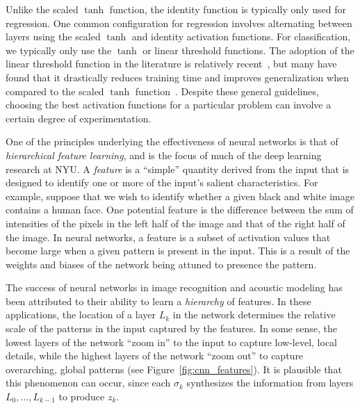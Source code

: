 \documentclass[11pt,a4paper]{article}
\numberwithin{equation}{section}
\begin{document}
Unlike the scaled $\tanh$ function, the identity function is typically only used
for regression. One common configuration for regression involves alternating
between layers using the scaled $\tanh$ and identity activation functions. For
classification, we typically only use the $\tanh$ or linear threshold functions.
The adoption of the linear threshold function in the literature is relatively
recent~\citep{nair2010rectified}, but many have found that it drastically
reduces training time and improves generalization when compared to the scaled
$\tanh$ function~\citep{krizhevsky2012imagenet}. Despite these general
guidelines, choosing the best activation functions for a particular problem can
involve a certain degree of experimentation.

One of the principles underlying the effectiveness of neural networks is that of
\emph{hierarchical feature learning}, and is the focus of much of the deep
learning research at NYU. A \emph{feature} is a ``simple'' quantity derived from
the input that is designed to identify one or more of the input's salient
characteristics. For example, suppose that we wish to identify whether a given
black and white image contains a human face. One potential feature is the
difference between the sum of intensities of the pixels in the left half of the
image and that of the right half of the image. In neural networks, a feature is
a subset of activation values that become large when a given pattern is present
in the input. This is a result of the weights and biases of the network being
attuned to presence the pattern.

The success of neural networks in image recognition and acoustic modeling has
been attributed to their ability to learn a \emph{hierarchy} of features. In
these applications, the location of a layer $L_k$ in the network determines the
relative scale of the patterns in the input captured by the features. In some
sense, the lowest layers of the network ``zoom in'' to the input to capture
low-level, local details, while the highest layers of the network ``zoom out''
to capture overarching, global patterns (see Figure~\ref{fig:cnn_features}). It
is plausible that this phenomenon can occur, since each $\sigma_k$ synthesizes
the information from layers $L_0, \ldots, L_{k - 1}$ to produce $z_k$.

\end{document}
